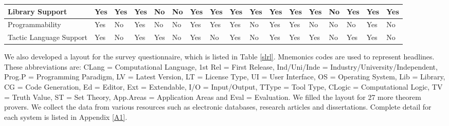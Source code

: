 \begin{table}[!ht]
{\begin{tabular}{|p{3cm}|p{0.8cm}|p{0.8cm}|p{0.8cm}|p{0.8cm}|p{0.8cm}|p{0.8cm}|p{0.8cm}|p{0.8cm}|p{0.8cm}|p{0.8cm}|p{0.8cm}|p{0.9cm}|p{0.8cm}|p{0.8cm}|p{0.8cm}|p{0.8cm}|}
  Library Support & \tiny{Yes} & \tiny{Yes} & \tiny{Yes} & \tiny{No} & \tiny{No} & \tiny{Yes} & \tiny{Yes} & \tiny{Yes} & \tiny{Yes} & \tiny{Yes} & \tiny{Yes} & \tiny{Yes} & \tiny{No} & \tiny{Yes} & \tiny{Yes} & \tiny{Yes}\\   \hline
  Programmability & \tiny{Yes} & \tiny{No} & \tiny{Yes} & \tiny{No} & \tiny{No} & \tiny{Yes} & \tiny{Yes} & \tiny{Yes} & \tiny{No} & \tiny{Yes} & \tiny{Yes} & \tiny{No} & \tiny{No} & \tiny{No} & \tiny{Yes} & \tiny{No}\\   \hline
  Tactic Language Support & \tiny{Yes} & \tiny{No} & \tiny{Yes} & \tiny{Yes} & \tiny{No} & \tiny{Yes} & \tiny{No} & \tiny{Yes} & \tiny{No} & \tiny{Yes} & \tiny{Yes} & \tiny{Yes} & \tiny{No} & \tiny{Yes} & \tiny{Yes} & \tiny{No}\\   \hline
   \end{tabular}
\label{modeltools5}
}
\end{table}
We also developed a layout for the survey questionnaire, which is listed in Table \ref{slrl}. Mnemonics codes are used to represent headlines. 
These abbreviations are: CLang = Computational Language, 1st Rel = First Release,
Ind/Uni/Inde = Industry/University/Independent, Prog.P = Programming Paradigm, LV = Latest Version, 
LT = License Type, UI = User Interface, OS = Operating System, Lib = Library, CG = Code Generation, Ed = Editor, Ext = Extendable, I/O = 
Input/Output,
TType = Tool Type, CLogic = Computational Logic, TV = Truth Value, ST = Set Theory, App.Areas = Application Areas and Eval = Evaluation. 
We filled the layout for 27 more theorem provers. We collect the data from various resources such as electronic databases, research articles 
and dissertations. Complete detail for each system is listed in Appendix  \ref{A1}.
